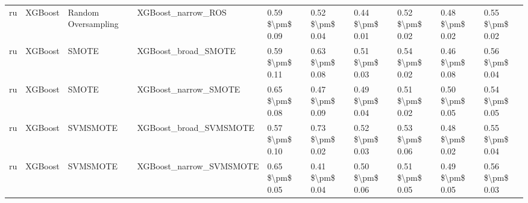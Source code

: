 \begin{tabular}{llllllllll}
      ru &                         XGBoost &           Random Oversampling &                           XGBoost\_narrow\_ROS &     0.59 \$\textbackslash pm\$ 0.09 &           0.52 \$\textbackslash pm\$ 0.04 &       0.44 \$\textbackslash pm\$ 0.01 &        0.52 \$\textbackslash pm\$ 0.02 &                         0.48 \$\textbackslash pm\$ 0.02 & 0.55 \$\textbackslash pm\$ 0.02 \\
      ru &                         XGBoost &                         SMOTE &                          XGBoost\_broad\_SMOTE &     0.59 \$\textbackslash pm\$ 0.11 &           0.63 \$\textbackslash pm\$ 0.08 &       0.51 \$\textbackslash pm\$ 0.03 &        0.54 \$\textbackslash pm\$ 0.02 &                         0.46 \$\textbackslash pm\$ 0.08 & 0.56 \$\textbackslash pm\$ 0.04 \\
      ru &                         XGBoost &                         SMOTE &                         XGBoost\_narrow\_SMOTE &     0.65 \$\textbackslash pm\$ 0.08 &           0.47 \$\textbackslash pm\$ 0.09 &       0.49 \$\textbackslash pm\$ 0.04 &        0.51 \$\textbackslash pm\$ 0.02 &                         0.50 \$\textbackslash pm\$ 0.05 & 0.54 \$\textbackslash pm\$ 0.05 \\
      ru &                         XGBoost &                      SVMSMOTE &                       XGBoost\_broad\_SVMSMOTE &     0.57 \$\textbackslash pm\$ 0.10 &           0.73 \$\textbackslash pm\$ 0.02 &       0.52 \$\textbackslash pm\$ 0.03 &        0.53 \$\textbackslash pm\$ 0.06 &                         0.48 \$\textbackslash pm\$ 0.02 & 0.55 \$\textbackslash pm\$ 0.04 \\
      ru &                         XGBoost &                      SVMSMOTE &                      XGBoost\_narrow\_SVMSMOTE &     0.65 \$\textbackslash pm\$ 0.05 &           0.41 \$\textbackslash pm\$ 0.04 &       0.50 \$\textbackslash pm\$ 0.06 &        0.51 \$\textbackslash pm\$ 0.05 &                         0.49 \$\textbackslash pm\$ 0.05 & 0.56 \$\textbackslash pm\$ 0.03 \\
\bottomrule
\end{tabular}
